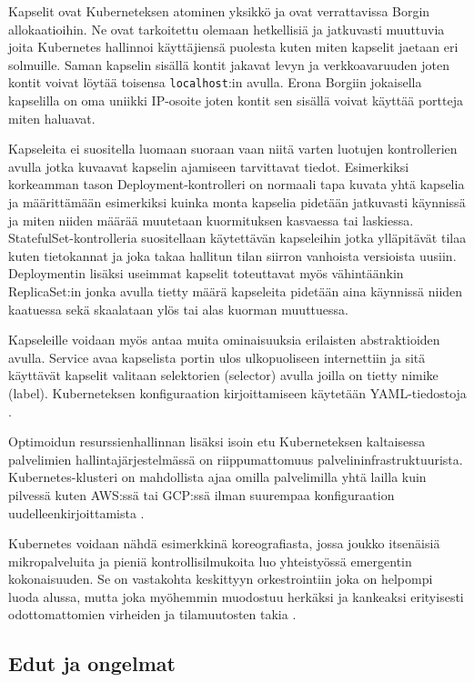 \documentclass[finnish,gradu]{tktltiki3}
\begin{document}
    Kapselit ovat Kuberneteksen atominen yksikkö ja ovat verrattavissa Borgin allokaatioihin. Ne ovat tarkoitettu olemaan hetkellisiä ja jatkuvasti muuttuvia joita Kubernetes hallinnoi käyttäjiensä puolesta kuten miten kapselit jaetaan eri solmuille. Saman kapselin sisällä kontit jakavat levyn ja verkkoavaruuden joten kontit voivat löytää toisensa \texttt{localhost}:in avulla. Erona Borgiin jokaisella kapselilla on oma uniikki IP-osoite joten kontit sen sisällä voivat käyttää portteja miten haluavat.
    
    Kapseleita ei suositella luomaan suoraan vaan niitä varten luotujen kontrollerien avulla jotka kuvaavat kapselin ajamiseen tarvittavat tiedot. Esimerkiksi korkeamman tason Deployment-kontrolleri on normaali tapa kuvata yhtä kapselia ja määrittämään esimerkiksi kuinka monta kapselia pidetään jatkuvasti käynnissä ja miten niiden määrää muutetaan kuormituksen kasvaessa tai laskiessa. StatefulSet-kontrolleria suositellaan käytettävän kapseleihin jotka ylläpitävät tilaa kuten tietokannat ja joka takaa hallitun tilan siirron vanhoista versioista uusiin. Deploymentin lisäksi useimmat kapselit toteuttavat myös vähintäänkin ReplicaSet:in jonka avulla tietty määrä kapseleita pidetään aina käynnissä niiden kaatuessa sekä skaalataan ylös tai alas kuorman muuttuessa.
    
    Kapseleille voidaan myös antaa muita ominaisuuksia erilaisten abstraktioiden avulla. Service avaa kapselista portin ulos ulkopuoliseen internettiin ja sitä käyttävät kapselit valitaan selektorien (selector) avulla joilla on tietty nimike (label). Kuberneteksen konfiguraation kirjoittamiseen käytetään YAML-tiedostoja \cite{kubernetes-docs}.
    
    Optimoidun resurssienhallinnan lisäksi isoin etu Kuberneteksen kaltaisessa palvelimien hallintajärjestelmässä on riippumattomuus palvelininfrastruktuurista. Kubernetes-klusteri on mahdollista ajaa omilla palvelimilla yhtä lailla kuin pilvessä kuten AWS:ssä tai GCP:ssä ilman suurempaa konfiguraation uudelleenkirjoittamista \cite{kubernetes-rule-world}.
    
    Kubernetes voidaan nähdä esimerkkinä koreografiasta, jossa joukko itsenäisiä mikropalveluita ja pieniä kontrollisilmukoita luo yhteistyössä emergentin kokonaisuuden. Se on vastakohta keskittyyn orkestrointiin joka on helpompi luoda alussa, mutta joka myöhemmin muodostuu herkäksi ja kankeaksi erityisesti odottomattomien virheiden ja tilamuutosten takia \cite{borg-omega-kubernetes}.
    
    \subsection{Edut ja ongelmat}
    
\end{document}
